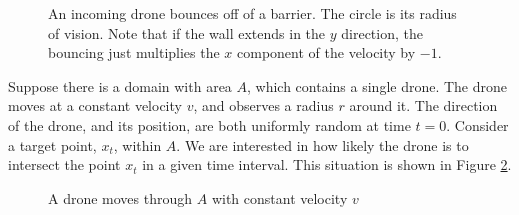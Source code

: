 \documentclass{article}
\begin{document}
\begin{figure}[h]
\begin{center}
\end{center}
\caption{An incoming drone bounces off of a barrier.  The circle is its radius
	of vision.
Note that if the wall extends in the $y$ direction, the bouncing just 
	multiplies the $x$ component of the velocity by $-1$.}
\label{fig:drone-barrier-bounce}
\end{figure}


Suppose there is a domain with area $A$, which contains a single drone.
The drone moves at a constant velocity $v$, and observes a radius $r$ around it.
The direction of the drone, and its position, are both uniformly random at time $t=0$.
Consider a target point, $x_t$, within $A$.
We are interested in how likely the drone is to intersect the point $x_t$ in a
	given time interval.
This situation is shown in Figure \ref{fig:drone-in-random}.

\begin{figure}[h!]
\begin{center}
\end{center}
\label{fig:drone-in-random}
\caption{A drone moves through $A$ with constant velocity $v$}
\end{figure}
\end{document}
